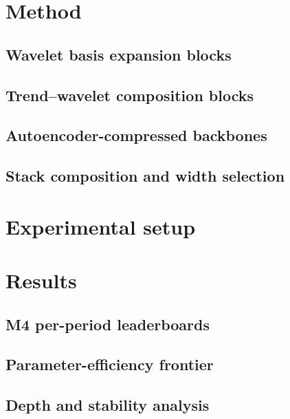 \documentclass{article}
\begin{document}
\section{Method}
\label{sec:method}

\subsection{Wavelet basis expansion blocks}
\label{sec:wavelet_blocks}

\subsection{Trend--wavelet composition blocks}
\label{sec:trend_wavelet}

\subsection{Autoencoder-compressed backbones}
\label{sec:ae_backbones}

\subsection{Stack composition and width selection}
\label{sec:stack_composition}

\section{Experimental setup}
\label{sec:experimental_setup}

\section{Results}
\label{sec:results}

\subsection{M4 per-period leaderboards}
\label{sec:m4_leaderboards}

\subsection{Parameter-efficiency frontier}
\label{sec:param_efficiency}

\subsection{Depth and stability analysis}
\label{sec:depth_stability}
\end{document}

